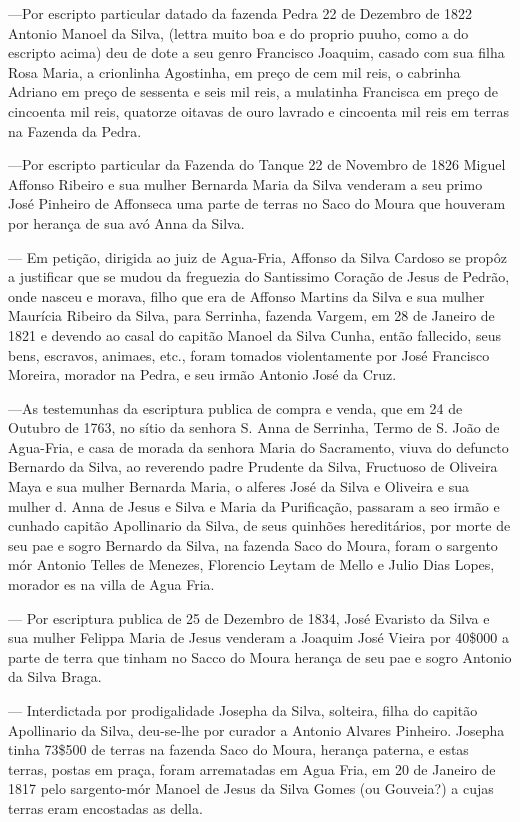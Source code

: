 —Por escripto particular datado da fazenda Pedra 22 de Dezembro de 1822 Antonio Manoel da Silva, (lettra muito boa e do proprio puuho, como a do escripto acima) deu de dote a seu genro Francisco Joaquim, casado com sua filha Rosa Maria, a crionlinha Agostinha, em preço de cem mil reis, o cabrinha Adriano em preço de sessenta e seis mil reis, a mulatinha Francisca em preço de cincoenta mil reis, quatorze oitavas de ouro lavrado e cincoenta mil reis em terras na Fazenda da Pedra.

—Por escripto particular da Fazenda do Tanque 22 de Novembro de 1826 Miguel Affonso Ribeiro e sua mulher Bernarda Maria da Silva venderam a seu primo José Pinheiro de Affonseca uma parte de terras no Saco do Moura que houveram por herança de sua avó Anna da Silva.

— Em petição, dirigida ao juiz de Agua-Fria, Affonso da Silva Cardoso se propôz a justificar que se mudou da freguezia do Santissimo Coração de Jesus de Pedrão, onde nasceu e morava, filho que era de Affonso Martins da Silva e sua mulher Maurícia Ribeiro da Silva, para Serrinha, fazenda Vargem, em 28 de Janeiro de 1821 e devendo ao casal do capitão Manoel da Silva Cunha, então fallecido, seus bens, escravos, animaes, etc., foram tomados violentamente por José Francisco Moreira, morador na Pedra, e seu irmão Antonio José da Cruz.

—As testemunhas da escriptura publica de compra e venda, que em 24 de Outubro de 1763, no sítio da senhora S. Anna de Serrinha, Termo de S. João de Agua-Fria, e casa de morada da senhora Maria do Sacramento, viuva do defuncto Bernardo da Silva, ao reverendo padre Prudente da Silva, Fructuoso de Oliveira Maya e sua mulher Bernarda Maria, o alferes José da Silva e Oliveira e sua mulher d. Anna de Jesus e Silva e Maria da Purificação, passaram a seo irmão e cunhado capitão Apollinario da Silva, de seus quinhões hereditários, por morte de seu pae e sogro Bernardo da Silva, na fazenda Saco do Moura, foram o sargento mór Antonio Telles de Menezes, Florencio Leytam de Mello e Julio Dias Lopes, morador es na villa de Agua Fria.

— Por escriptura publica de 25 de Dezembro de 1834, José Evaristo da Silva e sua mulher Felippa Maria de Jesus venderam a Joaquim José Vieira por 40\$000 a parte de terra que tinham no Sacco do Moura herança de seu pae e sogro Antonio da Silva Braga.

— Interdictada por prodigalidade Josepha da Silva, solteira, filha do capitão Apollinario da Silva, deu-se-lhe por curador a Antonio Alvares Pinheiro. Josepha tinha 73\$500 de terras na fazenda Saco do Moura, herança paterna, e estas terras, postas em praça, foram arrematadas em Agua Fria, em 20 de Janeiro de 1817 pelo sargento-mór Manoel de Jesus da Silva Gomes (ou Gouveia?) a cujas terras eram encostadas as della.

